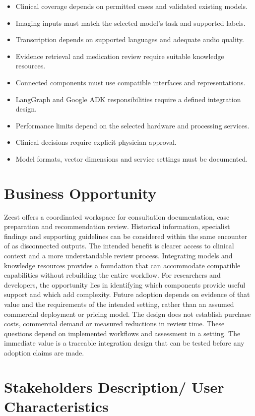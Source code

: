 \begin{itemize}
\item Clinical coverage depends on permitted cases and validated existing models.
\item Imaging inputs must match the selected model's task and supported labels.
\item Transcription depends on supported languages and adequate audio quality.
\item Evidence retrieval and medication review require suitable knowledge resources.
\item Connected components must use compatible interfaces and representations.
\item LangGraph and Google ADK responsibilities require a defined integration design.
\item Performance limits depend on the selected hardware and processing services.
\item Clinical decisions require explicit physician approval.
\item Model formats, vector dimensions and service settings must be documented.
\end{itemize}

\section{Business Opportunity}

Zeest offers a coordinated workspace for consultation documentation, case preparation and recommendation review. Historical information, specialist findings and supporting guidelines can be considered within the same encounter of as disconnected outputs. The intended benefit is clearer access to clinical context and a more understandable review process. Integrating models and knowledge resources provides a foundation that can accommodate compatible capabilities without rebuilding the entire workflow. For researchers and developers, the opportunity lies in identifying which components provide useful support and which add complexity. Future adoption depends on evidence of that value and the requirements of the intended setting, rather than an assumed commercial deployment or pricing model. The design does not establish purchase costs, commercial demand or measured reductions in review time. These questions depend on implemented workflows and assessment in a setting. The immediate value is a traceable integration design that can be tested before any adoption claims are made.

\section{Stakeholders Description/ User Characteristics}

